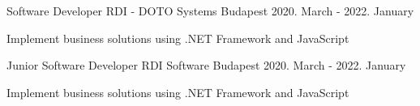 

\begin{cventries}

  \cventry
  {Software Developer} %
  {RDI - DOTO Systems} %
  {Budapest} %
  {2020. March - 2022. January} %
  {
    \begin{cvitems} %
      \item {Implement business solutions using .NET Framework and JavaScript}
    \end{cvitems}
  }


  \cventry
  {Junior Software Developer} %
  {RDI Software} %
  {Budapest} %
  {2020. March - 2022. January} %
  {
    \begin{cvitems} %
      \item {Implement business solutions using .NET Framework and JavaScript}
    \end{cvitems}
  }


\end{cventries}
